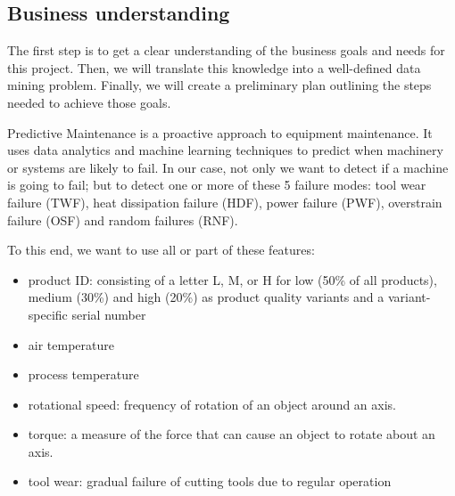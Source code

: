 \documentclass[11pt, a4paper]{article}
\begin{document}
\begin{multicols}{2}
	
\section{Business understanding}

The first step is to get a clear understanding of the business goals and needs for this project. 
Then, we will translate this knowledge into a well-defined data mining problem. 
Finally, we will create a preliminary plan outlining the steps needed to achieve those goals.

Predictive Maintenance is a proactive approach to equipment maintenance.
It uses data analytics and machine learning techniques to predict when machinery or systems are likely to fail. 
In our case, not only we want to detect if a machine is going to fail; but to detect one or more of these 5 failure modes:
tool wear failure (TWF), heat dissipation failure (HDF), power failure (PWF), overstrain failure (OSF) and random failures (RNF).

To this end, we want to use all or part of these features:
\begin{itemize}
	\item product ID: consisting of a letter L, M, or H for low (50\% of all products), medium (30\%) and high (20\%) as product quality variants and a variant-specific serial number
	\item air temperature
	\item process temperature
	\item rotational speed: frequency of rotation of an object around an axis.
	\item torque: a measure of the force that can cause an object to rotate about an axis.
	\item tool wear: gradual failure of cutting tools due to regular operation
\end{itemize}


\end{multicols}
\end{document}
